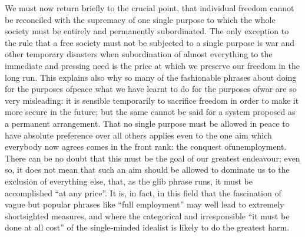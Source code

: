 \documentclass[11pt,openany]{book}
\begin{document}
\begin{center}\textasteriskcentered\hspace{0.9em}\textasteriskcentered\hspace{0.9em}\textasteriskcentered\end{center}

\begin{center}\textasteriskcentered\hspace{0.9em}\textasteriskcentered\hspace{0.9em}\textasteriskcentered\end{center}

\begin{center}\textasteriskcentered\hspace{0.9em}\textasteriskcentered\hspace{0.9em}\textasteriskcentered\end{center}

\begin{center}\textasteriskcentered\hspace{0.9em}\textasteriskcentered\hspace{0.9em}\textasteriskcentered\end{center}

\begin{center}\textasteriskcentered\hspace{0.9em}\textasteriskcentered\hspace{0.9em}\textasteriskcentered\end{center}

We must now return briefly to the crucial point, that individual freedom cannot be reconciled with the supremacy of one single purpose to which the whole society must be entirely and permanently subordinated. The only exception to the rule that a free society must not be subjected to a single purpose is war and other temporary disasters when subordination of almost everything to the immediate and pressing need is the price at which we preserve our freedom in the long run. This explains also why so many of the fashionable phrases about doing for the purposes ofpeace what we have learnt to do for the purposes ofwar are so very misleading: it is sensible temporarily to sacrifice freedom in order to make it more secure in the future; but the same cannot be said for a system proposed as a permanent arrangement. That no single purpose must be allowed in peace to have absolute preference over all others applies even to the one aim which everybody now agrees comes in the front rank: the conquest ofunemployment. There can be no doubt that this must be the goal of our greatest endeavour; even so, it does not mean that such an aim should be allowed to dominate us to the exclusion of everything else, that, as the glib phrase runs, it must be accomplished ``at any price''. It is, in fact, in this field that the fascination of vague but popular phrases like ``full employment'' may well lead to extremely shortsighted measures, and where the categorical and irresponsible ``it must be done at all cost'' of the single-minded idealist is likely to do the greatest harm.
\end{document}
